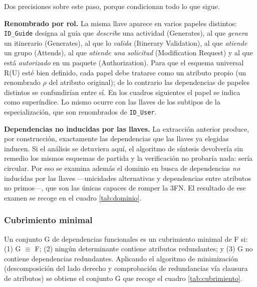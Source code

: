 \documentclass[11pt,a4paper]{article}
\begin{document}
Dos precisiones sobre este paso, porque condicionan todo lo que sigue.

\textbf{Renombrado por rol.} La misma llave aparece en varios papeles distintos: \texttt{ID\_\allowbreak{}Guide} designa al guía que \textit{describe} una actividad (Generates), al que \textit{genera} un itinerario (Generates), al que lo \textit{valida} (Itinerary Validation), al que \textit{atiende} un grupo (Attends), al que \textit{atiende una solicitud} (Modification Request) y al que está \textit{autorizado} en un paquete (Authorization). Para que el esquema universal R(U) esté bien definido, cada papel debe tratarse como un atributo propio (un renombrado \ensuremath{\rho} del atributo original); de lo contrario las dependencias de papeles distintos se confundirían entre sí. En los cuadros siguientes el papel se indica como superíndice. Lo mismo ocurre con las llaves de los subtipos de la especialización, que son renombrados de \texttt{ID\_\allowbreak{}User}.

\textbf{Dependencias no inducidas por las llaves.} La extracción anterior produce, por construcción, exactamente las dependencias que las llaves ya elegidas inducen. Si el análisis se detuviera aquí, el algoritmo de síntesis devolvería sin remedio los mismos esquemas de partida y la verificación no probaría nada: sería circular. Por eso se examina además el dominio en busca de dependencias \textit{no} inducidas por las llaves —unicidades alternativas y dependencias entre atributos no primos—, que son las únicas capaces de romper la 3FN. El resultado de ese examen se recoge en el cuadro \ref{tab:dominio}.
\subsubsection{Cubrimiento minimal}\label{sec:cubrimiento}
Un conjunto G de dependencias funcionales es un cubrimiento minimal de F si: (1) G \ensuremath{\equiv} F; (2) ningún determinante contiene atributos redundantes; y (3) G no contiene dependencias redundantes. Aplicando el algoritmo de minimización (descomposición del lado derecho y comprobación de redundancias vía clausura de atributos) se obtiene el conjunto G que recoge el cuadro \ref{tab:cubrimiento}.
\end{document}
